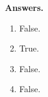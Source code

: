 
\textbf{Answers.}
\begin{enumerate}

  \item False.

  \item True.

  \item False.

  \item False.

\end{enumerate}

